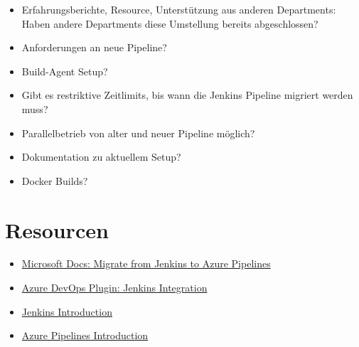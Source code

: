 \documentclass{article}
\begin{document}
\begin{itemize}
    \item Erfahrungsberichte, Resource, Unterstützung aus anderen Departments: Haben andere Departments diese Umstellung bereits abgeschlossen?
    \item Anforderungen an neue Pipeline?
    \item Build-Agent Setup?
    \item Gibt es restriktive Zeitlimits, bis wann die Jenkins Pipeline migriert werden muss?
    \item Parallelbetrieb von alter und neuer Pipeline möglich?
    \item Dokumentation zu aktuellem Setup?
    \item Docker Builds?
\end{itemize}

\section*{Resourcen}

\begin{itemize}
    \item \href{https://learn.microsoft.com/en-us/azure/devops/pipelines/migrate/from-jenkins?view=azure-devops}{Microsoft Docs: Migrate from Jenkins to Azure Pipelines}
    \item \href{https://marketplace.visualstudio.com/items?itemName=ms-vsts.services-jenkins}{Azure DevOps Plugin: Jenkins Integration}
    \item \href{https://www.jenkins.io/doc/tutorials/}{Jenkins Introduction}
    \item \href{https://learn.microsoft.com/en-us/azure/devops/pipelines/create-first-pipeline?view=azure-devops&tabs=java%2Ctfs-2018-2%2Cbrowser}{Azure Pipelines Introduction}
\end{itemize}
\end{document}
